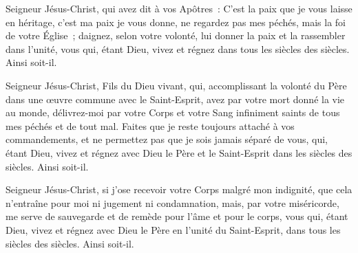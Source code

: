 Seigneur Jésus-Christ, qui avez dit à vos Apôtres~: C'est la paix que je vous laisse en héritage, c'est ma paix je vous donne, ne regardez pas mes péchés, mais la foi de votre Église~; daignez, selon votre volonté, lui donner la paix et la rassembler dans l'unité, vous qui, étant Dieu, vivez et régnez dans tous les siècles des siècles. Ainsi soit-il.


Seigneur Jésus-Christ, Fils du Dieu vivant, qui, accomplissant la volonté du Père dans une œuvre commune avec le Saint-Esprit, avez par votre mort donné la vie au monde, délivrez-moi par votre Corps et votre Sang infiniment saints de tous mes péchés et de tout mal. Faites que je reste toujours attaché à vos commandements, et ne permettez pas que je sois jamais séparé de vous, qui, étant Dieu, vivez et régnez avec Dieu le Père et le Saint-Esprit dans les siècles des siècles. Ainsi soit-il.

Seigneur Jésus-Christ, si j'ose recevoir votre Corps malgré mon indignité, que cela n'entraîne pour moi ni jugement ni condamnation, mais, par votre miséricorde, me serve de sauvegarde et de remède pour l'âme et pour le corps, vous qui, étant Dieu, vivez et régnez avec Dieu le Père en l'unité du Saint-Esprit, dans tous les siècles des siècles. Ainsi soit-il.




%

